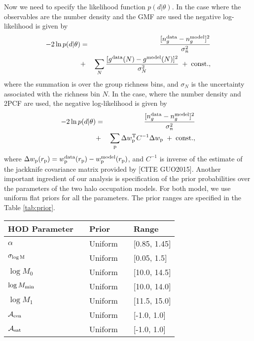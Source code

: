 \documentclass[12pt, preprint]{aastex}
\newcommand{\wpp}{w_{\rm p}}
\newcommand{\rpp}{r_{\rm p}}
\newcommand{\mzero}{\log M_{0}}
\newcommand{\mone}{\log M_{1}}
\newcommand{\mmin}{\log M_{\rm min}}
\newcommand{\sigmam}{\sigma_{\log \rm M}}
\newcommand{\acen}{\mathcal{A}_{\rm cen}}
\newcommand{\asat}{\mathcal{A}_{\rm sat}}
\begin{document}
Now we need to specify the likelihood function $p(d|\theta)$. In the case where the observables are the number density and the GMF are used the negative log-likelihood is given by
\begin{eqnarray}
-2\ln p(d|\theta) &=& \frac{[n^{\rm data}_{g}-n^{\rm model}_{g}]^{2}}{\sigma_{n}^{2}} \nonumber \\ &+& \sum_{N} \frac{[ g^{\rm data}(N)-g^{\rm model}(N)]^{2}}{\sigma^{2}_{N}} \; + \; \rm{const.},
\label{eq:lnlike_group}
\end{eqnarray}
where the summation is over the group richness bins, and $\sigma_{N}$ is the uncertainty associated with the richness bin $N$. In the case, where the number density and 2PCF are used, the negative log-likelihood is given by
\begin{eqnarray}
-2\ln p(d|\theta) &=& \frac{[n^{\rm data}_{g}-n^{\rm model}_{g}]^{2}}{\sigma_{n}^{2}} \nonumber \\  
&+&  \sum_{\rm p} \Delta \wpp^{\rm T}C^{-1}\Delta \wpp \; + \; \rm{const.},
\label{eq:lnlike_wp}
\end{eqnarray}
where $\Delta \wpp(\rpp) = \wpp^{\rm data}(\rpp)-\wpp^{\rm model}(\rpp)$, and  $C^{-1}$ is inverse of the estimate of the jackknife covariance matrix provided by [CITE GUO2015]. 
Another important ingredient of our analysis is specification of the prior probabilities over the parameters of the two halo occupation models. For both model, we use uniform flat priors for all the parameters. The prior ranges are specified in the Table \ref{tab:prior}. 

\begin{table*}
\begin{center}
  \label{tab:prior}
  \caption{{\bf Prior Specifications}: The prior probability distribution 
  and its range for each of the parameters. 
  All mass parameters are in unit of $h^{-1}M_\odot$. The first five rows are the only parameters of the standard HOD modeling.}
\begin{tabular}{@{}lllll}
\\ \hline 
    HOD Parameter & & Prior & & Range \\ \hline
  $\alpha$ & & Uniform & & [0.85, 1.45] \\
  $\sigmam$ & & Uniform & &  [0.05, 1.5] \\
   $\mzero$   & & Uniform & &  [10.0, 14.5] \\
  $\mmin$ & &   Uniform & &  [10.0, 14.0] \\
  $\mone$ & & Uniform & & [11.5, 15.0] \\ 
  $\acen$ & & Uniform & & [-1.0, 1.0] \\
  $\asat$ & & Uniform & & [-1.0, 1.0] \\
 \hline
  \end{tabular}
\end{center}
\end{table*}
\end{document}
